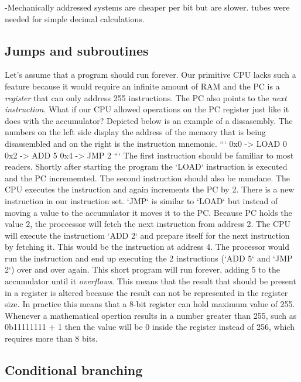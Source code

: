 -Mechanically addressed systems are cheaper per bit but are slower. 
tubes were needed for simple decimal calculations. 


\subsection{Jumps and subroutines}

Let's assume that a program should run forever. Our primitive CPU lacks such a feature because it
would require an infinite amount of RAM and the PC is a \textit{register} that can only address 255 
instructions. The PC also points to the \textit{next instruction}. What if our CPU allowed operations on
the PC register just like it does with the accumulator? Depicted below is an example of a 
dissasembly. The numbers on the left side display the address of the memory that is being
disassembled and on the right is the instruction mnemonic.
```
0x0 -> LOAD 0
0x2 -> ADD 5
0x4 -> JMP 2
```
The first instruction should be familiar to most readers. Shortly after starting the program the 
`LOAD` instruction is executed and the PC incrememted. The second instruction should also be mundane.
The CPU executes the instruction and again increments the PC by 2. There is a new instruction in our 
instruction set. `JMP` is similar to `LOAD` but instead of
moving a value to the accumulator it moves it to the PC. Because PC holds the value 2, the
proccessor will fetch the next instruction from address 2. The CPU will execute the instructiom
`ADD 2` and prepare itself for the next instruction by fetching it. This would be the instruction
at address 4. The processor would run the instruction and end up executing the 2 instructions
(`ADD 5` and `JMP 2`) over and over again. This short program will run forever, adding 5 to the
accumulator until it \textit{overflows}. This means that the result that should be present in a register
is altered because the result can not be represented in the register size. In practice this means
that a 8-bit register can hold maximum value of 255. Whenever a mathematical opertion results in a 
number greater than 255, such as 0b11111111 + 1 then the value will be 0 inside the register instead
of 256, which requires more than 8 bits.

\subsection{Conditional branching}

